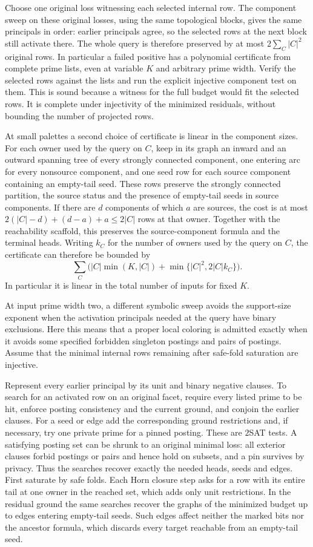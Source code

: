 Choose one original loss witnessing each selected
internal row. The component sweep on these
original losses, using the same topological
blocks, gives the same principals in order:
earlier principals agree, so the selected rows
at the next block still activate there. The
whole query is therefore preserved by at most
$2\sum_C |C|^2$ original rows. In particular a
failed positive has a polynomial certificate
from complete prime lists, even at variable
$K$ and arbitrary prime width. Verify the
selected rows against the lists and run the
explicit injective component test on them.
This is sound because a witness for the full
budget would fit the selected rows. It is
complete under injectivity of the minimized residuals,
without bounding the number of projected rows.

At small palettes a second choice of certificate
is linear in the component sizes. For each owner
used by the query on $C$, keep in its graph an
inward and an outward spanning tree of every
strongly connected component, one entering arc
for every nonsource component, and one seed row
for each source component containing an empty-tail
seed. These rows preserve the strongly connected
partition, the source status and the presence of
empty-tail seeds in source components. If there
are $d$ components of which $a$ are sources, the
cost is at most $2(|C|-d)+(d-a)+a\le2|C|$ rows
at that owner. Together with the reachability
scaffold, this preserves the source-component
formula and the terminal heads. Writing $k_C$
for the number of owners used by the query on
$C$, the certificate can therefore be bounded by
\[
 \sum_C \bigl(|C|\min(K,|C|)
                 +\min\{|C|^2,2|C|k_C\}\bigr).
\]
In particular it is linear in the total number of
inputs for fixed $K$.

At input prime width two, a different symbolic
sweep avoids the support-size exponent when the
activation principals needed at the query have
binary exclusions. Here this means that a proper
local coloring is admitted exactly when it avoids
some specified forbidden singleton postings and
pairs of postings. Assume that the minimal internal
rows remaining after safe-fold saturation are injective.

Represent every earlier principal by its unit and
binary negative clauses. To search for an activated
row on an original facet, require every listed
prime to be hit, enforce posting consistency and
the current ground, and conjoin the earlier clauses.
For a seed or edge add the corresponding ground
restrictions and, if necessary, try one private
prime for a pinned posting. These are $2$SAT tests.
A satisfying posting set can be shrunk to an
original minimal loss: all exterior clauses
forbid postings or pairs and hence hold on
subsets, and a pin survives by privacy. Thus the
searches recover exactly the needed heads, seeds
and edges. First saturate by safe folds. Each Horn
closure step asks for a row with its entire tail at
one owner in the reached set, which adds only unit
restrictions. In the residual ground the same
searches recover the graphs of the minimized
budget up to edges entering empty-tail seeds.
Such edges affect neither the marked bits nor
the ancestor formula, which discards every target
reachable from an empty-tail seed.

